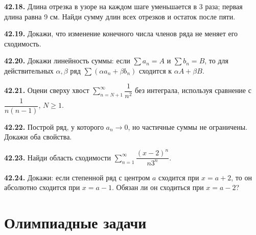 \noindent\begin{minipage}[t]{\linewidth}\textbf{42.18.} Длина отрезка в узоре на каждом шаге уменьшается в 3 раза; первая длина равна 9 см. Найди сумму длин всех отрезков и остаток после пяти.\par\end{minipage}\par
\noindent\begin{minipage}[t]{\linewidth}\textbf{42.19.} Докажи, что изменение конечного числа членов ряда не меняет его сходимость.\par\end{minipage}\par
\noindent\begin{minipage}[t]{\linewidth}\textbf{42.20.} Докажи линейность суммы: если \(\sum a_n=A\) и \(\sum b_n=B\), то для действительных \(\alpha,\beta\) ряд \(\sum(\alpha a_n+\beta b_n)\) сходится к \(\alpha A+\beta B\).\par\end{minipage}\par
\noindent\begin{minipage}[t]{\linewidth}\textbf{42.21.}\starmark{} Оцени сверху хвост \(\sum_{n=N+1}^\infty\dfrac1{n^2}\) без интеграла, используя сравнение с \(\dfrac1{n(n-1)}\), \(N\ge1\).\par\end{minipage}\par
\noindent\begin{minipage}[t]{\linewidth}\textbf{42.22.}\starmark{} Построй ряд, у которого \(a_n\to0\), но частичные суммы не ограничены. Докажи оба свойства.\par\end{minipage}\par
\noindent\begin{minipage}[t]{\linewidth}\textbf{42.23.}\starmark{} Найди область сходимости \(\sum_{n=1}^\infty\dfrac{(x-2)^n}{n3^n}\).\par\end{minipage}\par
\noindent\begin{minipage}[t]{\linewidth}\textbf{42.24.}\starmark{} Докажи: если степенной ряд с центром \(a\) сходится при \(x=a+2\), то он абсолютно сходится при \(x=a-1\). Обязан ли он сходиться при \(x=a-2\)?\par\end{minipage}\par
\par{}\section*{Олимпиадные задачи}
